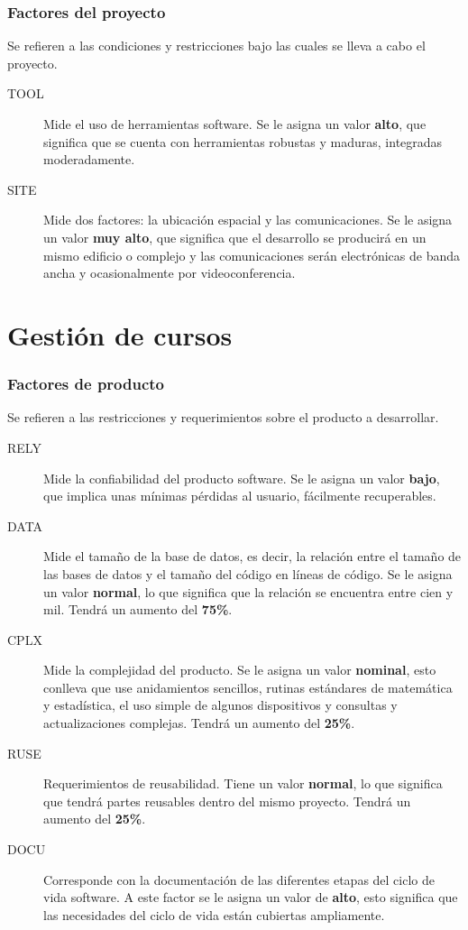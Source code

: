 \documentclass[11pt,a4paper,spanish,twoside]{book}
\begin{document}
\subsubsection{Factores del proyecto}
Se refieren a las condiciones y restricciones bajo las cuales se lleva a cabo
el proyecto.
\begin{description}
\item[TOOL] Mide el uso de herramientas software. Se le asigna un valor
\textbf{alto}, que significa que se cuenta con herramientas robustas y
maduras, integradas moderadamente.
\item[SITE] Mide dos factores: la ubicación espacial y las comunicaciones.
Se le asigna un valor \textbf{muy alto}, que significa que el desarrollo
se producirá en un mismo edificio o complejo y las comunicaciones serán
electrónicas de banda ancha y ocasionalmente por videoconferencia.
\end{description}

\section{Gestión de cursos}
\subsubsection{Factores de producto}
Se refieren a las restricciones y requerimientos sobre el producto a
desarrollar.
\begin{description}
\item[RELY] Mide la confiabilidad del producto software. Se le asigna un 
valor \textbf{bajo}, que implica unas mínimas pérdidas al usuario,
fácilmente recuperables.

\item[DATA] Mide el tamaño de la base de datos, es decir, la relación entre
el tamaño de las bases de datos y el tamaño del código en líneas de código. Se
le asigna un valor \textbf{normal}, lo que significa que la relación se
encuentra entre cien y mil. Tendrá un aumento del \textbf{75\%}. 

\item[CPLX] Mide la complejidad del producto. Se le asigna un
valor \textbf{nominal}, esto conlleva que use anidamientos sencillos, rutinas
estándares de matemática y estadística, el uso simple de algunos dispositivos
y consultas y actualizaciones complejas. Tendrá un aumento del 
\textbf{25\%}.

\item[RUSE] Requerimientos de reusabilidad. Tiene un valor \textbf{normal},
lo que significa que tendrá partes reusables dentro del mismo
proyecto. Tendrá un aumento del \textbf{25\%}.

\item[DOCU] Corresponde con la documentación de las diferentes etapas del
ciclo de vida software. A este factor se le asigna un valor de \textbf{alto},
esto significa que las necesidades del ciclo de vida están cubiertas
ampliamente.

\end{description}
\end{document}
